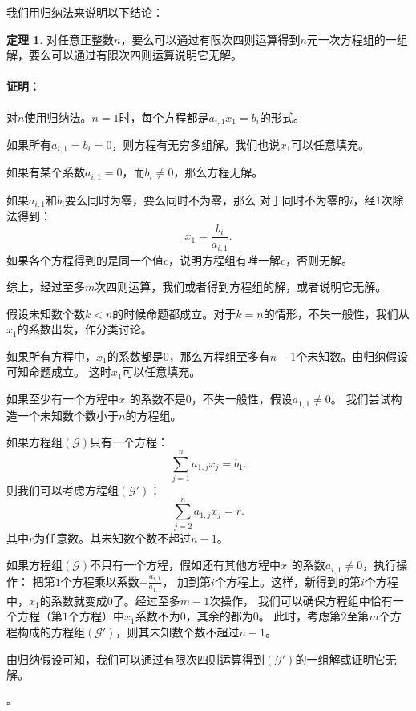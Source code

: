 \documentclass[12pt,UTF8]{ctexbook}
\theoremstyle{definition}
\newtheorem{tm}{定理}[section]
\theoremstyle{plain}
\renewenvironment{proof}{\paragraph{\textbf{证明：}}}{\hfill$\square$}
\begin{document}
我们用归纳法来说明以下结论：
\begin{tm}
    对任意正整数$n$，要么可以通过有限次四则运算得到$n$元一次方程组的一组解，要么可以通过有限次四则运算说明它无解。
\end{tm}

\begin{proof}
    对$n$使用归纳法。$n=1$时，每个方程都是$a_{i,1} x_1 = b_i$的形式。

    如果所有$a_{i,1} = b_i = 0$，则方程有无穷多组解。我们也说$x_1$可以任意填充。
    
    如果有某个系数$a_{i,1} = 0$，而$b_i\neq 0$，那么方程无解。

    如果$a_{i,1}$和$b_i$要么同时为零，要么同时不为零，那么
    对于同时不为零的$i$，经$1$次除法得到：
    $$ x_1 = \frac{b_i}{a_{i,1}}. $$
    如果各个方程得到的是同一个值$c$，说明方程组有唯一解$c$，否则无解。

    综上，经过至多$m$次四则运算，我们或者得到方程组的解，或者说明它无解。

    假设未知数个数$k<n$的时候命题都成立。对于$k=n$的情形，不失一般性，我们从$x_1$的系数出发，作分类讨论。

    如果所有方程中，$x_1$的系数都是$0$，那么方程组至多有$n-1$个未知数。由归纳假设可知命题成立。
    这时$x_1$可以任意填充。

    如果至少有一个方程中$x_1$的系数不是$0$，不失一般性，假设$a_{1,1} \neq 0$。
    我们尝试构造一个未知数个数小于$n$的方程组。

    如果方程组$(\mathcal{G})$只有一个方程：
    $$ \sum_{j=1}^n a_{1,j} x_j = b_{1}. $$
    则我们可以考虑方程组$(\mathcal{G}')$：
    $$ \sum_{j=2}^n a_{1,j} x_j = r. $$
    其中$r$为任意数。其未知数个数不超过$n-1$。



    如果方程组$(\mathcal{G})$不只有一个方程，假如还有其他方程中$x_1$的系数$a_{i,1} \neq 0$，执行操作：
    把第$1$个方程乘以系数$-\frac{a_{i,1}}{a_{1,1}}$，
    加到第$i$个方程上。这样，新得到的第$i$个方程中，$x_1$的系数就变成$0$了。经过至多$m-1$次操作，
    我们可以确保方程组中恰有一个方程（第$1$个方程）中$x_1$系数不为$0$，其余的都为$0$。
    此时，考虑第$2$至第$m$个方程构成的方程组$(\mathcal{G}')$，则其未知数个数不超过$n-1$。

    由归纳假设可知，我们可以通过有限次四则运算得到$(\mathcal{G}')$的一组解或证明它无解。


\end{proof}
\end{document}
